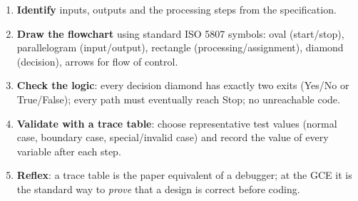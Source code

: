 \documentclass[11pt]{article}
\begin{document}
\begin{methode}
\begin{enumerate}
\item \textbf{Identify} inputs, outputs and the processing steps from the specification.
\item \textbf{Draw the flowchart} using standard ISO 5807 symbols: oval (start/stop), parallelogram (input/output), rectangle (processing/assignment), diamond (decision), arrows for flow of control.
\item \textbf{Check the logic}: every decision diamond has exactly two exits (Yes/No or True/False); every path must eventually reach Stop; no unreachable code.
\item \textbf{Validate with a trace table}: choose representative test values (normal case, boundary case, special/invalid case) and record the value of every variable after each step.
\item \textbf{Reflex}: a trace table is the paper equivalent of a debugger; at the GCE it is the standard way to \emph{prove} that a design is correct before coding.
\end{enumerate}
\end{methode}
\end{document}
